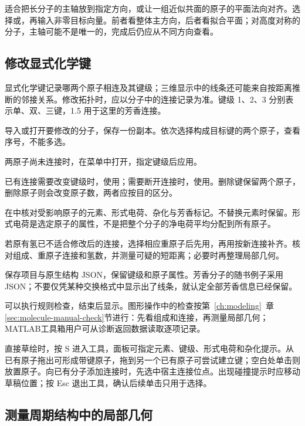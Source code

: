适合把长分子的主轴放到指定方向，或让一组近似共面的原子的平面法向对齐。选择或，再输入非零目标向量。前者看整体主方向，后者看拟合平面；对高度对称的分子，主轴可能不是唯一的，完成后仍应从不同方向查看。

\subsection{修改显式化学键}\label{sec:bond-edit-reference}

显式化学键记录哪两个原子相连及其键级；三维显示中的线条还可能来自按距离推断的邻接关系。修改拓扑时，应以分子中的连接记录为准。键级 1、2、3 分别表示单、双、三键，1.5 用于这里的芳香连接。

\begin{steps}
  \item 导入或打开要修改的分子，保存一份副本。依次选择构成目标键的两个原子，查看序号，不能多选。
  \item 两原子尚未连接时，在菜单中打开，指定键级后应用。
  \item 已有连接需要改变键级时，使用；需要断开连接时，使用。删除键保留两个原子，删除原子则会改变原子数，两者应按目的区分。
  \item 在中核对受影响原子的元素、形式电荷、杂化与芳香标记。不替换元素时保留。形式电荷是选定原子的属性，不是把整个分子的净电荷平均分配到所有原子。
  \item 若原有氢已不适合修改后的连接，选择相应重原子后先用，再用按新连接补齐。核对组成、重原子连接和氢数，并测量可疑的短距离；必要时再整理局部几何。
  \item 保存项目与原生结构 JSON，保留键级和原子属性。芳香分子的随书例子采用 JSON；不要仅凭某种交换格式中显示出了线条，就认定全部芳香信息已经保留。
\end{steps}

可以执行规则检查，结束后显示。图形操作中的检查按第~\ref{ch:modeling}~章\ref{sec:molecule-manual-check}节进行：先看组成和连接，再测量局部几何；MATLAB\regmark{}工具箱用户可从诊断返回数据读取逐项记录。

直接草绘时，按 S 进入工具，面板可指定元素、键级、形式电荷和杂化提示。从已有原子拖出可形成带键原子，拖到另一个已有原子可尝试建立键；空白处单击则放置原子。向已有分子添加连接时，先选中宿主连接位点。出现碰撞提示时应移动草稿位置；按 Esc 退出工具，确认后续单击只用于选择。

\subsection{测量周期结构中的局部几何}\label{sec:periodic-measure-reference}

